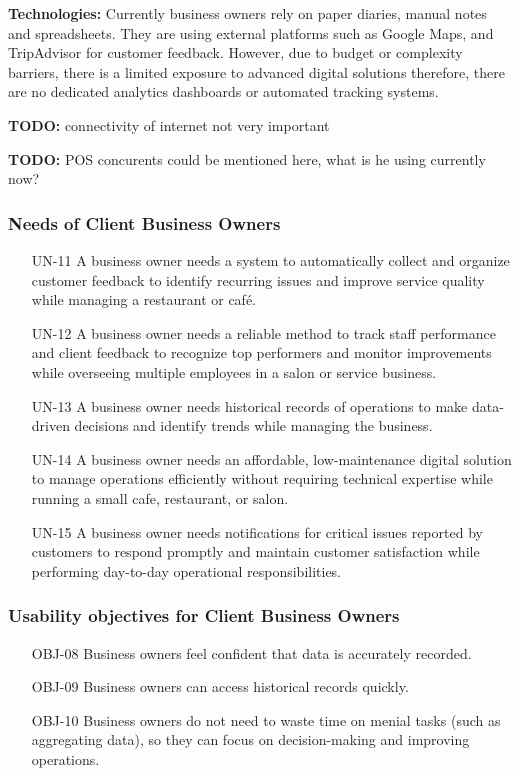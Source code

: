 \documentclass[]{VUMIFTemplateClass}
\newcommand{\todocomment}[1]{%
    \begin{tcolorbox}[colback=red!20, colframe=red!60, arc=0pt, outer arc=0pt, boxrule=1pt, left=3pt, right=3pt, top=3pt, bottom=3pt]
        \textbf{\textcolor{orange!70!black}{TODO:}} #1
    \end{tcolorbox}
}
\begin{document}
    \textbf{Technologies:} Currently business owners rely on paper diaries,
    manual notes and spreadsheets. They are using external platforms such as
    Google Maps, and TripAdvisor for customer feedback. However, due to budget
    or complexity barriers, there is a limited exposure to advanced digital
    solutions therefore, there are no dedicated analytics dashboards or
    automated tracking systems.

    \todocomment{connectivity of internet not very important}
    \todocomment{POS concurents could be mentioned here, what is he using currently now?}

\subsubsection{Needs of Client Business Owners}
\begin{itemize}
    \item[UN-11] A business owner needs a system to automatically collect and organize customer feedback to identify recurring issues and improve service quality while managing a restaurant or café.
    \item[UN-12] A business owner needs a reliable method to track staff performance and client feedback to recognize top performers and monitor improvements while overseeing multiple employees in a salon or service business.
    \item[UN-13] A business owner needs historical records of operations to make data-driven decisions and identify trends while managing the business.
    \item[UN-14] A business owner needs an affordable, low-maintenance digital solution to manage operations efficiently without requiring technical expertise while running a small cafe, restaurant, or salon.
    \item[UN-15] A business owner needs notifications for critical issues reported by customers to respond promptly and maintain customer satisfaction while performing day-to-day operational responsibilities.
\end{itemize}


\subsubsection{Usability objectives for Client Business Owners}
\begin{itemize}
    \item[OBJ-08] Business owners feel confident that data is accurately recorded.
    \item[OBJ-09] Business owners can access historical records quickly.
    \item[OBJ-10] Business owners do not need to waste time on menial tasks (such as aggregating data), so they can focus on decision-making and improving operations.
\end{itemize}
\end{document}

